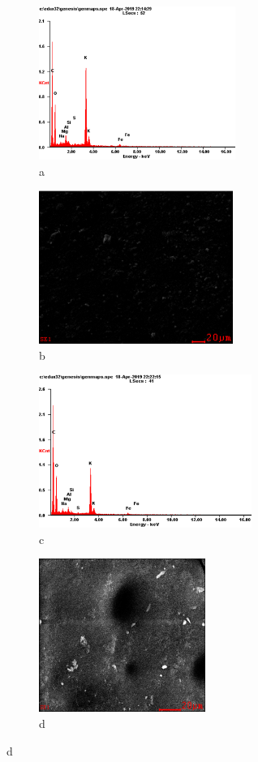 \begin{figure}[H]
    \centering
    \begin{subfigure}[t]{0.45\textwidth}
        \centering
        \includegraphics[height=5cm]{media/chem2/image87}
        \caption*{a}
    \end{subfigure}
    \begin{subfigure}[t]{0.45\textwidth}
        \centering
        \includegraphics[height=5cm]{media/chem2/image88}
        \caption*{b}
    \end{subfigure}
    
    \begin{subfigure}[t]{0.45\textwidth}
        \centering
        \includegraphics[height=5cm]{media/chem2/image89}
        \caption*{c}
    \end{subfigure}
    \begin{subfigure}[t]{0.45\textwidth}
        \centering
        \includegraphics[height=5cm]{media/chem2/image90}
        \caption*{d}
    \end{subfigure}
    

\end{figure}
